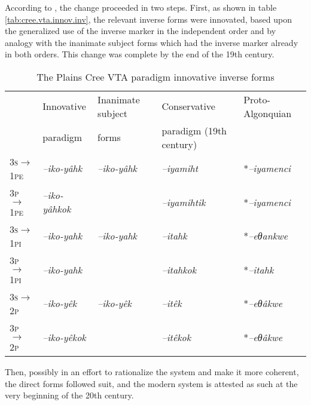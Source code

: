 \documentclass[twoside,a4paper,11pt]{article}
\newcommand{\ipa}[1]{{\phon\textit{#1}}}
\newcommand{\grise}[1]{\cellcolor{lightgray}\textbf{#1}}
\newcommand{\Σ}{\greek{Σ}}
\begin{document}
According to \cite{dahlstrom89change}, the change proceeded in two steps. First, as shown in table \vref{tab:cree.vta.innov.inv}, the relevant inverse forms
were innovated, based upon the generalized use of the inverse marker in the independent order and by analogy with the inanimate subject forms which had the inverse marker already in both orders. This change was complete by the end of the 19th century.

\begin{table}[H]
\caption{The Plains Cree VTA paradigm innovative inverse forms}
\centering \label{tab:cree.vta.innov.inv}
\begin{tabular}{lllll}
\toprule
& Innovative & Inanimate subject& Conservative & Proto-Algonquian \\
&paradigm & forms & paradigm (19th century) &\\
\midrule
\textsc{3s$\rightarrow$1pe} & 	\ipa{--iko-yâhk} \grise{}& \ipa{--iko-yâhk} &	\ipa{--iyamiht} &  *\ipa{--iyamenci}\\
\textsc{3p$\rightarrow$1pe} & 	\ipa{--iko-yâhkok} \grise{}& 	& \ipa{--iyamihtik}\grise{} &  *\ipa{--iyamenci}\\
\textsc{3s$\rightarrow$1pi} & 	\ipa{--iko-yahk} \grise{}& \ipa{--iko-yahk} &	\ipa{--itahk}  & *\ipa{--eθankwe} \\
\textsc{3p$\rightarrow$1pi} & 	\ipa{--iko-yahk} \grise{}& 	& \ipa{--itahkok}\grise{}  &*\ipa{--itahk}\\
\midrule
\textsc{3s$\rightarrow$2p} & \ipa{--iko-yêk} \grise{}&  \ipa{--iko-yêk} &	\ipa{--itêk} & *\ipa{--eθâkwe}\\
\textsc{3p$\rightarrow$2p} & \ipa{--iko-yêkok} \grise{}& 	& \ipa{--itêkok}\grise{} & *\ipa{--eθâkwe}\\

\bottomrule
\end{tabular}
\end{table}

Then, possibly in an effort to rationalize the system and make it more coherent, the direct forms followed suit, and the modern system is attested as such at the very beginning of the 20th century.
\end{document}
